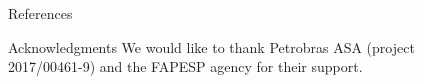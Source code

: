 \documentclass[final]{beamer}
\newlength{\sepwidth}
\newlength{\colwidth}
\newcommand{\separatorcolumn}{\begin{column}{\sepwidth}\end{column}}
\begin{document}
\begin{frame}[t]
\begin{columns}[t]
\begin{column}{\colwidth}


  \begin{block}{References}
    \nocite{*}
    \footnotesize{}

  \end{block}
  
  \begin{block}{Acknowledgments}
  We would like to thank Petrobras ASA (project 2017/00461-9) and the FAPESP agency for their support.
  \end{block}

\end{column}

\separatorcolumn
\end{columns}

\end{frame}
\end{document}
